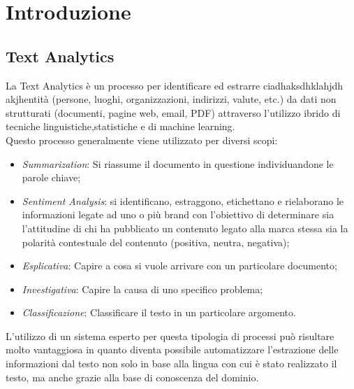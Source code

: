 
\section{Introduzione}

\subsection{Text Analytics}
\nocite{wiki:textMining}
\nocite{gartner:textAnalytics}
\nocite{expertsystem:textAnalytics}
La Text Analytics è un processo per identificare ed estrarre  ciadhaksdhklahjdh akjhentità (persone, luoghi, organizzazioni, indirizzi, valute, etc.) da dati non strutturati (documenti, pagine web, email, PDF) attraverso l'utilizzo ibrido di tecniche linguistiche,statistiche e di machine learning. 
$$ $$
Questo processo generalmente viene utilizzato per diversi scopi:
\begin{itemize}
	\item \emph{Summarization}: Si riassume il documento in questione individuandone le parole chiave;
	\item \emph{Sentiment Analysis}: si identificano, estraggono, etichettano e rielaborano le informazioni legate ad uno o più brand con l'obiettivo di determinare sia l'attitudine di chi ha pubblicato un contenuto legato alla marca stessa sia la polarità contestuale del contenuto (positiva, neutra, negativa);
	\item \emph{Esplicativa}: Capire a cosa si vuole arrivare con un particolare documento;
	\item \emph{Investigativa}: Capire la causa di uno specifico problema;
	\item \emph{Classificazione}: Classificare il testo in un particolare argomento.
\end{itemize}

L'utilizzo di un sistema esperto per questa tipologia di processi può risultare molto vantaggiosa in quanto diventa possibile automatizzare l'estrazione delle informazioni dal testo non solo in base alla lingua con cui è stato realizzato il testo, ma anche grazie alla base di conoscenza del dominio.


